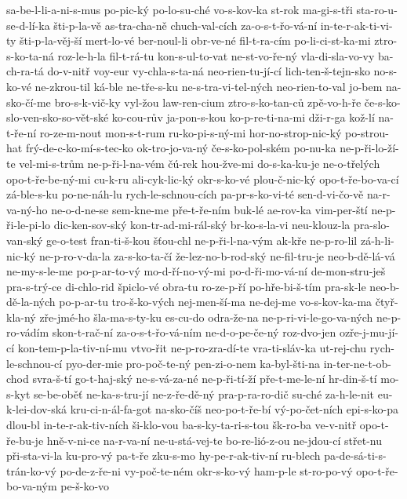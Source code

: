 {sa-be-l-li-a-ni-s-mus
po-pic-ký
po-lo-su-ché
vo-s-kov-ka
st-rok
ma-gi-s-tři
sta-ro-u-se-d-lí-ka
šti-p-la-vě
as-tra-cha-ně
chuch-val-cích
za-o-s-t-řo-vá-ní
in-te-r-ak-ti-vi-ty
šti-p-la-věj-ší
mert-lo-vé
ber-noul-li
obr-ve-né
fil-t-ra-cím
po-li-ci-st-ka-mi
ztro-s-ko-ta-ná
roz-le-h-la
fil-t-rá-tu
kon-s-ul-to-vat
ne-st-vo-ře-ný
vla-di-sla-vo-vy
ba-ch-ra-tá
do-v-nitř
voy-eur
vy-chla-s-ta-ná
neo-rien-tu-jí-cí
lich-ten-š-tejn-sko
no-s-ko-vé
ne-zkrou-til
ká-ble
ne-tře-s-ku
ne-s-tra-vi-tel-ných
neo-rien-to-val
jo-bem
na-sko-čí-me
bro-s-k-vič-ky
vyl-žou
law-ren-cium
ztro-s-ko-tan-ců
zpě-vo-h-ře
če-s-ko-slo-ven-sko-so-vět-ské
ko-cou-rův
ja-pon-s-kou
ko-p-re-ti-na-mi
dži-r-ga
kož-lí
na-t-ře-ní
ro-ze-m-nout
mon-s-t-rum
ru-ko-pi-s-ný-mi
hor-no-strop-nic-ký
po-strou-hat
frý-de-c-ko-mí-s-tec-ko
ok-tro-jo-va-ný
če-s-ko-pol-ském
po-nu-ka
ne-p-ři-lo-ží-te
vel-mi-s-trům
ne-p-ři-l-na-vém
čú-rek
hou-žve-mi
do-s-ka-ku-je
ne-o-třelých
opo-t-ře-be-ný-mi
cu-k-ru
ali-cyk-lic-ký
okr-s-ko-vé
plou-č-nic-ký
opo-t-ře-bo-va-cí
zá-ble-s-ku
po-ne-náh-lu
rych-le-schnou-cích
pa-pr-s-ko-vi-té
sen-d-vi-čo-vě
na-r-va-ný-ho
ne-o-d-ne-se
sem-kne-me
pře-t-ře-ním
buk-lé
ae-rov-ka
vim-per-ští
ne-p-ři-le-pi-lo
dic-ken-sov-ský
kon-tr-ad-mi-rál-ský
br-ko-s-la-vi
neu-klouz-la
pra-slo-van-ský
ge-o-test
fran-ti-š-kou
šťou-chl
ne-p-ři-l-na-vým
ak-kře
ne-p-ro-lil
zá-h-li-nic-ký
ne-p-ro-v-da-la
za-s-ko-ta-čí
že-lez-no-b-rod-ský
ne-fil-tru-je
neo-b-dě-lá-vá
ne-my-s-le-me
po-p-ar-to-vý
mo-d-ří-no-vý-mi
po-d-ři-mo-vá-ní
de-mon-stru-ješ
pra-s-trý-ce
di-chlo-rid
špiclo-vé
obra-tu
ro-ze-p-ří
po-hře-bi-š-tím
pra-sk-le
neo-b-dě-la-ných
po-p-ar-tu
tro-š-ko-vých
nej-men-ší-ma
ne-dej-me
vo-s-kov-ka-ma
čtyř-kla-ný
zře-jmé-ho
šla-ma-s-ty-ku
es-cu-do
odra-že-na
ne-p-ri-vi-le-go-va-ných
ne-p-ro-vádím
skon-t-rač-ní
za-o-s-t-řo-vá-ním
ne-d-o-pe-če-ný
roz-dvo-jen
ozře-j-mu-jí-cí
kon-tem-p-la-tiv-ní-mu
vtvo-řit
ne-p-ro-zra-dí-te
vra-ti-sláv-ka
ut-rej-chu
rych-le-schnou-cí
pyo-der-mie
pro-poč-te-ný
pen-zi-o-nem
ka-byl-šti-na
in-ter-ne-t-ob-chod
svra-š-tí
go-t-haj-ský
ne-s-vá-za-né
ne-p-ři-tí-ží
pře-t-me-le-ní
hr-din-š-tí
mo-s-kyt
se-be-oběť
ne-ka-s-tru-jí
ne-z-ře-dě-ný
pra-p-ra-ro-dič
su-ché
za-h-le-nit
eu-k-lei-dov-ská
kru-ci-n-ál-fa-got
na-sko-číš
neo-po-t-ře-bí
vý-po-čet-ních
epi-s-ko-pa
dlou-bl
in-te-r-ak-tiv-ních
ši-klo-vou
ba-s-ky-ta-ri-s-tou
šk-ro-ba
ve-v-nitř
opo-t-ře-bu-je
hně-v-ni-ce
na-r-va-ní
ne-u-stá-vej-te
bo-re-lió-z-ou
ne-jdou-cí
střet-nu
při-sta-vi-la
ku-pro-vý
pa-t-ře
zku-s-mo
hy-pe-r-ak-tiv-ní
ru-blech
pa-de-sá-ti-s-trán-ko-vý
po-de-z-ře-ni
vy-poč-te-ném
okr-s-ko-vý
ham-p-le
st-ro-po-vý
opo-t-ře-bo-va-ným
pe-š-ko-vo
}
